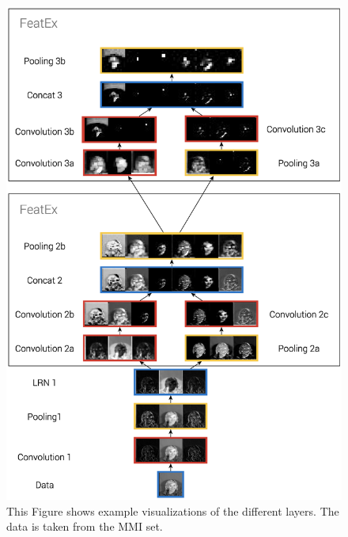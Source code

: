 \begin{figure}[ht]
\centering
\includegraphics[width=\columnwidth]{Fig5.eps}
\caption{This Figure shows example visualizations of the different layers. The data is taken from the MMI set.}
\label{fig:feature_extraction}
\end{figure}